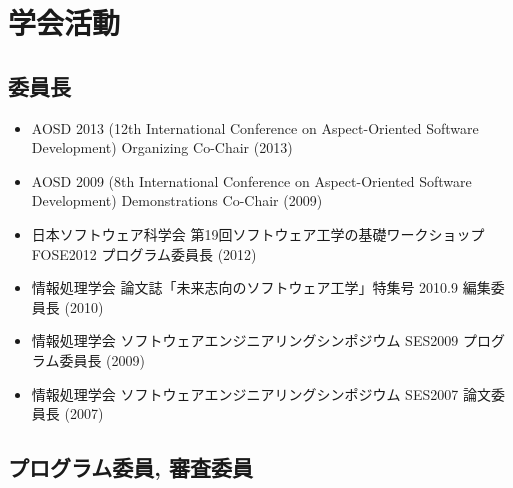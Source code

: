 \documentclass{jarticle}
\begin{document}
\section{学会活動}

\subsection{委員長}

\begin{itemize}
\item AOSD 2013 (12th International Conference on Aspect-Oriented Software Development) Organizing Co-Chair (2013)
\item AOSD 2009 (8th International Conference on Aspect-Oriented Software Development) Demonstrations Co-Chair (2009)
\end{itemize}

\begin{itemize}
\item 日本ソフトウェア科学会 第19回ソフトウェア工学の基礎ワークショップ FOSE2012 プログラム委員長 (2012)

\item 情報処理学会 論文誌「未来志向のソフトウェア工学」特集号 2010.9 編集委員長 (2010)

\item 情報処理学会 ソフトウェアエンジニアリングシンポジウム SES2009 プログラム委員長 (2009)

\item 情報処理学会 ソフトウェアエンジニアリングシンポジウム SES2007 論文委員長 (2007)
\end{itemize}


\subsection{プログラム委員, 審査委員}
\end{document}
